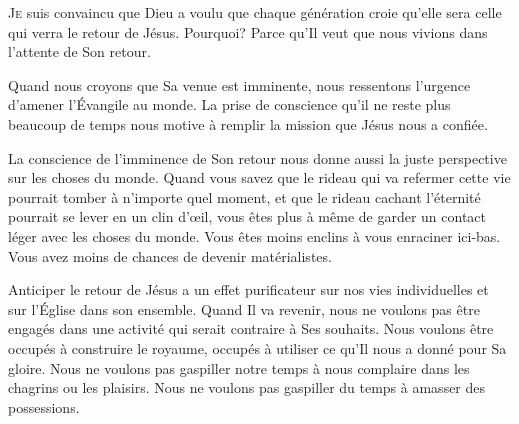 \dvrule








\lettrine{J}{e} suis convaincu
 que Dieu a voulu que chaque génération
 croie qu'elle sera celle qui verra le retour de Jésus.
 Pourquoi? Parce qu'Il veut que nous vivions
 dans l'attente de Son retour.

Quand nous croyons que Sa venue est imminente,
 nous ressentons l'urgence d'amener l'Évangile au monde.
 La prise de conscience qu'il ne reste plus beaucoup
 de temps nous motive à remplir la mission que Jésus nous a confiée. 


La conscience de l'imminence de Son retour nous donne aussi
 la juste perspective sur les choses du monde.
 Quand vous savez que le rideau qui va refermer cette vie
 pourrait tomber à n'importe quel moment,
 et que le rideau cachant l'éternité pourrait se lever en un clin d'\oe{}il,
 vous êtes plus à même de garder un contact léger avec les choses du monde.
 Vous êtes moins enclins à vous enraciner ici-bas.
 Vous avez moins de chances de devenir matérialistes.

Anticiper le retour de Jésus a un effet purificateur
 sur nos vies individuelles et sur l'Église dans son ensemble.
 Quand Il va revenir, nous ne voulons pas être engagés dans une activité
 qui serait contraire à Ses souhaits.
 Nous voulons être occupés à construire le royaume,
 occupés à utiliser ce qu'Il nous a donné pour Sa gloire.
 Nous ne voulons pas gaspiller notre temps à nous complaire
 dans les chagrins ou les plaisirs.
 Nous ne voulons pas gaspiller du temps à amasser des possessions.

